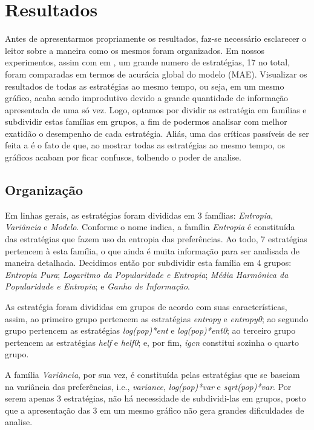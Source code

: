 \chapter{Resultados}
\label{cap:resultados}

Antes de apresentarmos propriamente os resultados, faz-se necessário esclarecer o leitor sobre a maneira como os mesmos foram organizados. Em nossos experimentos, assim com em \citep{Elahi:2014:ALS:2542182.2542195}, um grande numero de estratégias, 17 no total, foram comparadas em termos de acurácia global do modelo (MAE). Visualizar os resultados de todas as estratégias ao mesmo tempo, ou seja, em um mesmo gráfico, acaba sendo improdutivo devido a grande quantidade de informação apresentada de uma só vez. Logo, optamos por dividir as estratégia em famílias e subdividir estas famílias em grupos, a fim de podermos analisar com melhor exatidão o desempenho de cada estratégia. Aliás, uma das críticas passíveis de ser feita a \citep{Elahi:2014:ALS:2542182.2542195} é o fato de que, ao mostrar todas as estratégias ao mesmo tempo, os gráficos acabam por ficar confusos, tolhendo o poder de analise.

\section{Organização}

Em linhas gerais, as estratégias foram divididas em 3 famílias: \textit{Entropia}, \textit{Variância} e \textit{Modelo}. Conforme o nome indica, a família \textit{Entropia} é constituída das estratégias que fazem uso da entropia das preferências. Ao todo, 7 estratégias pertencem à esta família, o que ainda é muita informação para ser analisada de maneira detalhada. Decidimos então por subdividir esta família em 4 grupos: \textit{Entropia Pura}; \textit{Logaritmo da Popularidade e Entropia}; \textit{Média Harmônica da Popularidade e Entropia}; e \textit{Ganho de Informação}.  

As estratégia foram divididas em grupos de acordo com suas características, assim, ao primeiro grupo pertencem as estratégias \textit{entropy} e \textit{entropy0}; ao segundo grupo pertencem as estratégias \textit{log(pop)*ent} e \textit{log(pop)*ent0}; ao terceiro grupo pertencem as estratégias \textit{helf} e \textit{helf0}; e, por fim, \textit{igcn} constitui sozinha o quarto grupo. 

A família \textit{Variância}, por sua vez, é constituída pelas estratégias que se baseiam na variância das preferências, i.e., \textit{variance}, \textit{log(pop)*var} e \textit{sqrt(pop)*var}. Por serem apenas 3 estratégias, não há necessidade de subdividi-las em grupos, posto que a apresentação das 3 em um mesmo gráfico não gera grandes dificuldades de analise.

